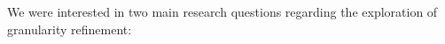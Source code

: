 We were interested in two main research questions regarding the exploration of granularity refinement: 

